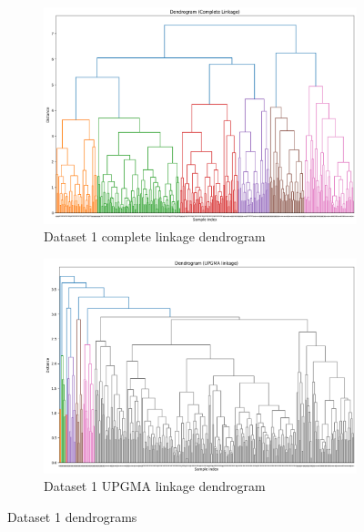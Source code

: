\documentclass[12pt]{report}
\begin{document}
	\begin{figure}[H]
		\centering
		\begin{subfigure}{.5\textwidth}
			\centering
			\includegraphics[width=.9\linewidth]{../AHC/Dendrograms/Dataset1/completeLinkage.png}
			\caption{Dataset 1 complete linkage dendrogram}
			\label{Dataset1completeLinkage}
		\end{subfigure}%
		\begin{subfigure}{.5\textwidth}
			\centering
			\includegraphics[width=.9\linewidth]{../AHC/Dendrograms/Dataset1/UPGMA_linkage.png}
			\caption{Dataset 1 UPGMA linkage dendrogram}
			\label{Dataset1UPGMA}
		\end{subfigure}
		\caption{Dataset 1 dendrograms}
		\label{Dataset1Dendrograms}
	\end{figure}
\end{document}
